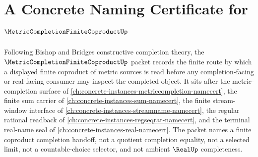 \chapter{A Concrete Naming Certificate for $\MetricCompletionFiniteCoproductUp$}
\label{ch:concrete-instances-metric-completion-finite-coproduct-namecert}

Following Bishop and Bridges constructive completion theory, the $\MetricCompletionFiniteCoproductUp$ packet records the finite route by which a displayed finite coproduct of metric sources is read before any completion-facing or real-facing consumer may inspect the completed object. It sits after the metric-completion surface of \autoref{ch:concrete-instances-metriccompletion-namecert}, the finite sum carrier of \autoref{ch:concrete-instances-sum-namecert}, the finite stream-window interface of \autoref{ch:concrete-instances-streamname-namecert}, the regular rational readback of \autoref{ch:concrete-instances-regseqrat-namecert}, and the terminal real-name seal of \autoref{ch:concrete-instances-real-namecert}. The packet names a finite coproduct completion handoff, not a quotient completion equality, not a selected limit, not a countable-choice selector, and not ambient $\RealUp$ completeness.

